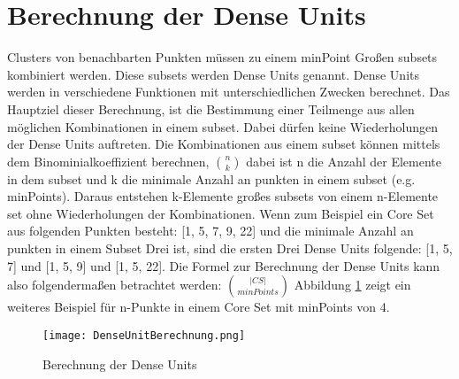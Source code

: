 \section{Berechnung der Dense Units}
Clusters von benachbarten Punkten müssen zu einem minPoint Großen subsets kombiniert werden. Diese subsets werden Dense Units genannt.
Dense Units werden in verschiedene Funktionen mit unterschiedlichen Zwecken berechnet. Das Hauptziel dieser Berechnung, ist die Bestimmung einer Teilmenge aus allen möglichen Kombinationen in einem subset. Dabei dürfen keine Wiederholungen der Dense Units auftreten. Die Kombinationen aus einem subset können mittels dem Binominialkoeffizient berechnen, $ \binom{n}{k} $ dabei ist n die Anzahl der Elemente in dem subset und k die minimale Anzahl an punkten in einem subset (e.g. minPoints). Daraus entstehen k-Elemente großes subsets von einem n-Elemente set ohne Wiederholungen der Kombinationen.
Wenn zum Beispiel ein Core Set aus folgenden Punkten besteht: [1, 5, 7, 9, 22] und die minimale Anzahl an punkten in einem Subset Drei ist, sind die ersten Drei Dense Units folgende: [1, 5, 7] und [1, 5, 9] und [1, 5, 22]. Die Formel zur Berechnung der Dense Units kann also folgendermaßen betrachtet werden: 
$ \binom{|CS|}{minPoints}$ \cite{7022654} Abbildung \ref{dense-calculation} zeigt ein weiteres Beispiel für n-Punkte in einem Core Set mit minPoints von 4.

\begin{figure}
	\centering
	\texttt{[image: DenseUnitBerechnung.png]}
	\caption{Berechnung der Dense Units}
	\label{dense-calculation}
\end{figure}